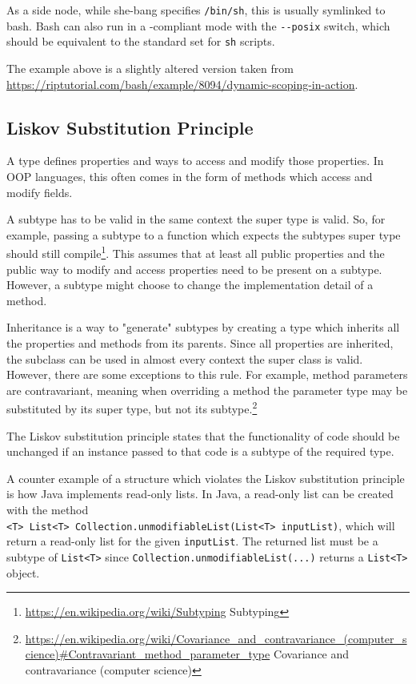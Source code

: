 \documentclass[
]{article}
\begin{document}
As a side node, while she-bang specifies \texttt{/bin/sh}, this is
usually symlinked to bash. Bash can also run in a -compliant mode with
the \texttt{-\/-posix} switch, which should be equivalent to the
standard set for \texttt{sh} scripts.

The example above is a slightly altered version taken from
\url{https://riptutorial.com/bash/example/8094/dynamic-scoping-in-action}.

\subsection{\texorpdfstring{Liskov Substitution Principle
}{Liskov Substitution Principle }}\label{liskov-substitution-principle}

A type defines properties and ways to access and modify those
properties. In OOP languages, this often comes in the form of methods
which access and modify fields.

A subtype has to be valid in the same context the super type is valid.
So, for example, passing a subtype to a function which expects the
subtype\textquotesingle s super type should still compile\footnote{\url{https://en.wikipedia.org/wiki/Subtyping}
  Subtyping}. This assumes that at least all public properties and the
public way to modify and access properties need to be present on a
subtype. However, a subtype might choose to change the implementation
detail of a method.

Inheritance is a way to "generate" subtypes by creating a type which
inherits all the properties and methods from its parents. Since all
properties are inherited, the subclass can be used in almost every
context the super class is valid. However, there are some exceptions to
this rule. For example, method parameters are contravariant, meaning
when overriding a method the parameter type may be substituted by its
super type, but not its subtype.\footnote{\url{https://en.wikipedia.org/wiki/Covariance_and_contravariance_(computer_science)\#Contravariant_method_parameter_type}
  Covariance and contravariance (computer science)}

The Liskov substitution principle states that the functionality of code
should be unchanged if an instance passed to that code is a subtype of
the required type.

A counter example of a structure which violates the Liskov substitution
principle is how Java implements read-only lists. In Java, a read-only
list can be created with the method
\texttt{\textless{}T\textgreater{}\ List\textless{}T\textgreater{}\ Collection.unmodifiableList(List\textless{}T\textgreater{}\ inputList)},
which will return a read-only list for the given \texttt{inputList}. The
returned list must be a subtype of
\texttt{List\textless{}T\textgreater{}} since
\texttt{Collection.unmodifiableList(...)} returns a
\texttt{List\textless{}T\textgreater{}} object.
\end{document}
